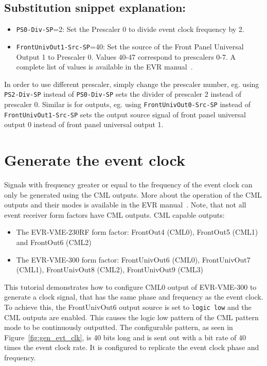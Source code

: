 \documentclass[12pt,a4paper]{article}
\begin{document}
\subsection{Substitution snippet explanation:}\label{sec:explain_clock}
\begin{itemize}
	\item \texttt{PS0-Div-SP}=2: Set the Prescaler 0 to divide event clock frequency by 2.
	\item \texttt{FrontUnivOut1-Src-SP}=40: Set the source of the Front Panel Universal Output 1 to Prescaler 0. Values 40-47 correspond to prescalers 0-7. A complete list of values is available in the EVR manual~\cite{evr_manual}.
\end{itemize}

In order to use different prescaler, simply change the prescaler number, eg. using \texttt{PS2-Div-SP} instead of \texttt{PS0-Div-SP} sets the divider of prescaler 2 instead of prescaler 0.
Similar is for outputs, eg. using \texttt{FrontUnivOut0-Src-SP} instead of \texttt{FrontUnivOut1-Src-SP} sets the output source signal of front panel universal output 0 instead of front panel universal output 1.

\section{Generate the event clock}\label{sec:generate_event_clock}
Signals with frequency greater or equal to the frequency of the event clock can only be generated using the CML outputs. More about the operation of the CML outputs and their modes is available in the EVR manual~\cite{evr_manual}. Note, that not all event receiver form factors have CML outputs.
CML capable outputs:
\begin{itemize}
	\item The EVR-VME-230RF form factor: FrontOut4 (CML0), FrontOut5 (CML1) and FrontOut6 (CML2)
	\item The EVR-VME-300 form factor: FrontUnivOut6 (CML0), FrontUnivOut7 (CML1), FrontUnivOut8 (CML2), FrontUnivOut9 (CML3)
\end{itemize} 
This tutorial demonstrates how to configure CML0 output of EVR-VME-300 to generate a clock signal, that has the same phase and frequency as the event clock. To achieve this, the FrontUnivOut6 output source is set to \texttt{logic low} and the CML outputs are enabled. This causes the logic low pattern of the CML pattern mode to be continuously outputted. The configurable pattern, as seen in Figure~\ref{fig:gen_evt_clk}, is 40 bits long and is sent out with a bit rate of 40 times the event clock rate. It is configured to replicate the event clock phase and frequency.
\end{document}
